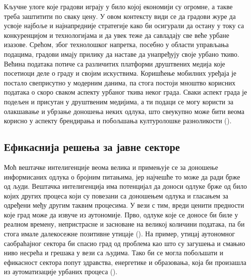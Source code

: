 \documentclass{article}
\begin{document}
Кључне улоге које градови играју у било којој економији су огромне, а такве треба заштитити по сваку цену. У овом контексту види се да градови журе да усвоје најбоље и најнапредније стратегије како би осигурали да остану у току са конкуренцијом и технологијама и да увек теже да савладају све веће урбане изазове. Срећом, због технолошког напретка, посебно у области управљања подацима, градови имају прилику да наставе да унапређују своје урбано ткиво. Већина података потиче са различитих платформи друштвених медија које посетиоци деле о граду и својим искуствима. Коришћење мобилних уређаја је постало свеприсутно у модерним данима, па стога постоји мноштво корисних података о скоро сваком аспекту урбаног ткива неког града. Сваки аспект града је подељен и присутан у друштвеним медијима, а ти подаци се могу користи за олакшавање и убрзање доношења неких одлука, што свеукупно може бити веома корисно у аспекту брендирања и побољшања културолошке разноликости (\cite{alamjr}).

\subsection{Ефикаснија решења за јавне секторе}
Моћ вештачке интелигенције веома велика и примењује се за доношење информисаних одлука о бројним питањима, јер најчешће то може да ради брже од људи. Вештачка интелигенција има потенцијал да доноси одлуке брже од било којих других процеса који су повезани са доношењем одлука и гласањем за одређени међу другим таквим процесима. У вези с тим, вреди ценити предности које град може да извуче из аутономије. Прво, одлуке које се доносе би биле у реалном времену, непристрасне и засноване на великој количини података, па би стога имале далекосежне позитивне утицаје (\cite{mohamed}). На пример, утицај аутономног саобраћајног сектора би спасио град од проблема као што су загушења и смањио ниво несрећа и грешака у вези са људима. Тако би се могла побољшати и ефикасност сектора попут здравства, енергетике и образовања, која би произашла из аутоматизације урбаних процеса (\cite{norman}).
\end{document}
